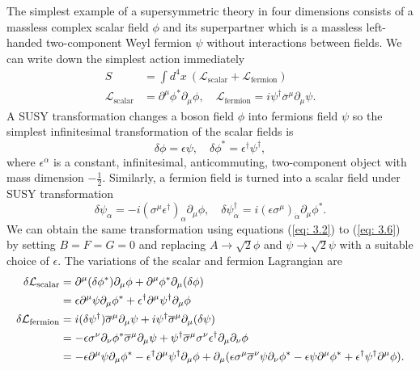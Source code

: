 \documentclass[12pt]{report}
\begin{document}
The simplest example of a supersymmetric theory in four dimensions consists of a massless complex scalar field $\phi$ and its superpartner which is a massless left-handed two-component Weyl fermion $\psi$ without interactions between fields.
We can write down the simplest action immediately
\begin{align}
S &= \int d^{4} x \ (\mathcal{L}_{\mathrm{scalar}} + \mathcal{L}_{\mathrm{fermion}})\\
\mathcal{L}_{\mathrm{scalar}} &= \partial^{\mu} \phi^{*} \partial_{\mu} \phi, \quad \mathcal{L}_{\mathrm{fermion}} = i \psi^{\dag} \overline{\sigma}^{\mu} \partial_{\mu} \psi .
\end{align}
A SUSY transformation changes a boson field $\phi$ into fermions field $\psi$ so the simplest infinitesimal transformation of the scalar fields is
\begin{equation} \label{eq: susy transformation for boson fields}
\delta \phi  = \epsilon \psi, \quad \delta \phi^{*} = \epsilon^{\dag} \psi^{\dag} ,
\end{equation}
where $\epsilon^{\alpha}$ is a constant, infinitesimal, anticommuting, two-component object with mass dimension $-\frac{1}{2}$.
Similarly, a fermion field is turned into a scalar field under SUSY transformation
\begin{equation} \label{eq: susy transformation for fermion fields}
\delta \psi_{\alpha} = -i (\sigma^{\mu} \epsilon^{\dag})_{\alpha} \partial_{\mu} \phi, \quad \delta \psi^{\dag}_{\dot{\alpha}} = i (\epsilon \sigma^{\mu})_{\dot{\alpha}} \partial_{\mu} \phi^{*} .
\end{equation}
We can obtain the same transformation using equations (\ref{eq: 3.2}) to (\ref{eq: 3.6}) by setting $B = F = G =0$ and replacing $A \to \sqrt{2} \phi$ and $\psi \to \sqrt{2} \psi$ with a suitable choice of $\epsilon$.
The variations of the scalar and fermion Lagrangian are
\begin{align}
\delta \mathcal{L}_{\mathrm{scalar}} &= \partial^{\mu} (\delta \phi^{*}) \partial_{\mu} \phi + \partial^{\mu} \phi^{*} \partial_{\mu} (\delta \phi) \notag \\
&= \epsilon \partial^{\mu} \psi \partial_{\mu} \phi^{*} + \epsilon^{\dag} \partial^{\mu} \psi^{\dag} \partial_{\mu} \phi\\
%
\delta \mathcal{L}_{\mathrm{fermion}} &= i (\delta \psi^{\dag}) \overline{\sigma}^{\mu} \partial_{\mu} \psi + i \psi^{\dag} \overline{\sigma}^{\mu} \partial_{\mu} (\delta \psi) \notag \\
&= -\epsilon \sigma^{\nu} \partial_{\nu} \phi^{*} \overline{\sigma}^{\mu} \partial_{\mu} \psi + \psi^{\dag} \overline{\sigma}^{\mu} \sigma^{\nu} \epsilon^{\dag} \partial_{\mu} \partial_{\nu} \phi \notag \\
&= -\epsilon \partial^{\mu} \psi \partial_{\mu} \phi^{*} - \epsilon^{\dag} \partial^{\mu} \psi^{\dag} \partial_{\mu} \phi
+\partial_{\mu} (\epsilon \sigma^{\mu} \overline{\sigma}^{\nu} \psi \partial_{\nu} \phi^{*} - \epsilon \psi \partial^{\mu} \phi^{*} + \epsilon^{\dag} \psi^{\dag} \partial^{\mu}\phi) .
\end{align}
\end{document}
